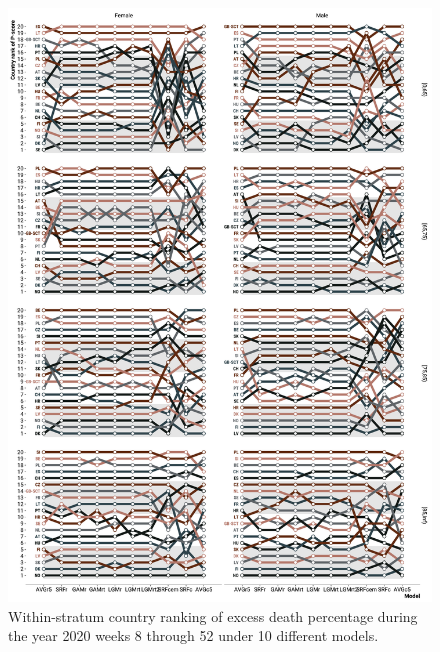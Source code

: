 \documentclass[12pt]{article}
\begin{document}
\begin{appendix}
\begin{figure}
\caption{Within-stratum country ranking of excess death percentage during the year 2020 weeks 8 through 52 under 10 different models.}
\label{fig:rankstrata}
\vspace{-1em}\includegraphics{rank_strata.pdf}
\end{figure}

\end{appendix}
\end{document}
